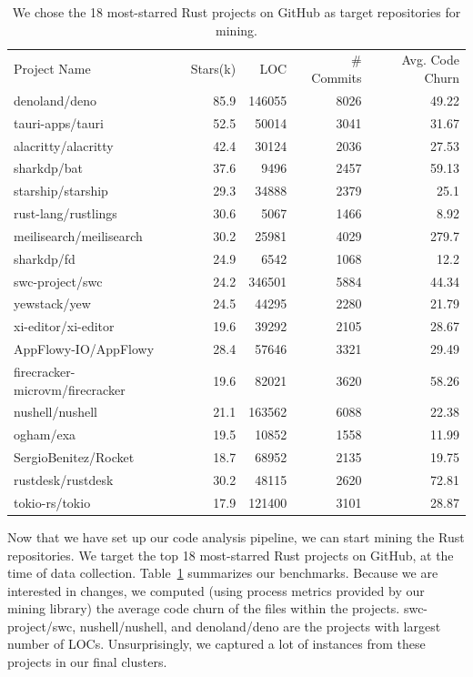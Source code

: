 \begin{table}
\caption{\label{table:repos} We chose the 18 most-starred Rust projects on GitHub as target repositories for mining.
}
\begin{tabular}{l r r r r}
    Project Name & Stars(k) & LOC & \# Commits & Avg. Code Churn \\
    denoland/deno & 85.9 & 146055 & 8026 & 49.22 \\
    tauri-apps/tauri & 52.5 & 50014 & 3041 & 31.67 \\
    alacritty/alacritty & 42.4 & 30124 & 2036 & 27.53 \\
    sharkdp/bat & 37.6 & 9496 & 2457 & 59.13 \\
    starship/starship & 29.3 & 34888 & 2379 & 25.1 \\
    rust-lang/rustlings & 30.6 & 5067 & 1466 & 8.92 \\
    meilisearch/meilisearch & 30.2 & 25981 & 4029 & 279.7 \\
    sharkdp/fd & 24.9 & 6542 & 1068 & 12.2 \\
    swc-project/swc & 24.2 & 346501 & 5884 & 44.34 \\
    yewstack/yew & 24.5 & 44295 & 2280 & 21.79 \\
    xi-editor/xi-editor & 19.6 & 39292 & 2105 & 28.67 \\
    AppFlowy-IO/AppFlowy & 28.4 & 57646 & 3321 & 29.49 \\
    firecracker-microvm/firecracker & 19.6 & 82021 & 3620 & 58.26 \\
    nushell/nushell & 21.1 & 163562 & 6088 & 22.38 \\
    ogham/exa & 19.5 & 10852 & 1558 & 11.99 \\
    SergioBenitez/Rocket & 18.7 & 68952 & 2135 & 19.75 \\
    rustdesk/rustdesk & 30.2 & 48115 & 2620 & 72.81 \\
    tokio-rs/tokio & 17.9 & 121400 & 3101 & 28.87 
\end{tabular}
\end{table}
   

Now that we have set up our code analysis pipeline, we can start mining the Rust repositories. We target the top 18 most-starred Rust projects on GitHub, at the time of data collection. Table~\ref{table:repos} summarizes our benchmarks. Because we are interested in changes, we computed (using process metrics provided by our mining library) the average code churn of the files within the projects. swc-project/swc, nushell/nushell, and denoland/deno are the projects with largest number of LOCs. Unsurprisingly, we captured a lot of instances from these projects in our final clusters.

